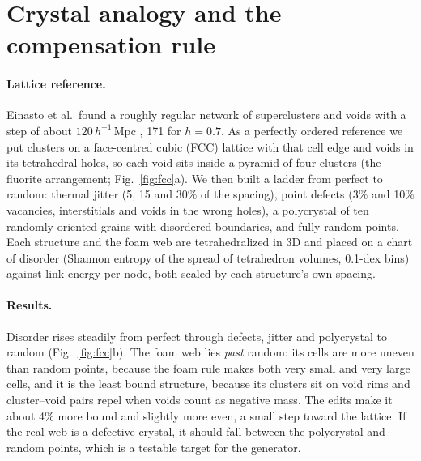 \documentclass[aps,prd,twocolumn,nofootinbib,superscriptaddress,floatfix]{revtex4-2}
\begin{document}
\section{Crystal analogy and the compensation rule}\label{sec:crystal}
\paragraph*{Lattice reference.} Einasto et al.\ found a roughly regular network of superclusters and voids with a step of about $120\,h^{-1}$\,Mpc \cite{Einasto1997Nature,Einasto1997II}, \SI{171}{\Mpc} for $h=0.7$. As a perfectly ordered reference we put clusters on a face-centred cubic (FCC) lattice with that cell edge and voids in its tetrahedral holes, so each void sits inside a pyramid of four clusters (the fluorite arrangement; Fig.~\ref{fig:fcc}a). We then built a ladder from perfect to random: thermal jitter (5, 15 and 30\% of the spacing), point defects (3\% and 10\% vacancies, interstitials and voids in the wrong holes), a polycrystal of ten randomly oriented grains with disordered boundaries, and fully random points. Each structure and the foam web are tetrahedralized in 3D and placed on a chart of disorder (Shannon entropy of the spread of tetrahedron volumes, 0.1-dex bins) against link energy per node, both scaled by each structure's own spacing.

\paragraph*{Results.} Disorder rises steadily from perfect through defects, jitter and polycrystal to random (Fig.~\ref{fig:fcc}b). The foam web lies \emph{past} random: its cells are more uneven than random points, because the foam rule makes both very small and very large cells, and it is the least bound structure, because its clusters sit on void rims and cluster--void pairs repel when voids count as negative mass. The edits make it about 4\% more bound and slightly more even, a small step toward the lattice. If the real web is a defective crystal, it should fall between the polycrystal and random points, which is a testable target for the generator.
\end{document}
